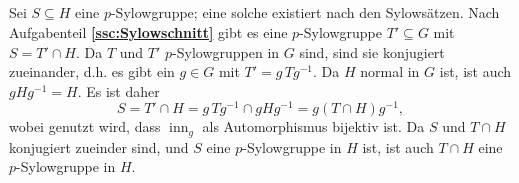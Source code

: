 \documentclass[a4paper,10pt]{article}
\theoremstyle{definition}
\newcommand{\inn}{\operatorname{inn}}
\begin{document}
\subsection{}
Sei $S \subseteq H$ eine $p$-Sylowgruppe; eine solche existiert nach den Sylowsätzen. Nach Aufgabenteil \textbf{\ref{ssc:Sylowschnitt}} gibt es eine $p$-Sylowgruppe $T' \subseteq G$ mit $S = T' \cap H$. Da $T$ und $T'$ $p$-Sylowgruppen in $G$ sind, sind sie konjugiert zueinander, d.h. es gibt ein $g \in G$ mit $T' = g\, T g^{-1}$. Da $H$ normal in $G$ ist, ist auch $gHg^{-1} = H$. Es ist daher
\[
 S = T' \cap H = g\, T g^{-1} \cap g H g^{-1} = g(T \cap H)g^{-1},
\]
wobei genutzt wird, dass $\inn_g$ als Automorphismus bijektiv ist. Da $S$ und $T \cap H$ konjugiert zueinder sind, und $S$ eine $p$-Sylowgruppe in $H$ ist, ist auch $T \cap H$ eine $p$-Sylowgruppe in $H$.
\end{document}
